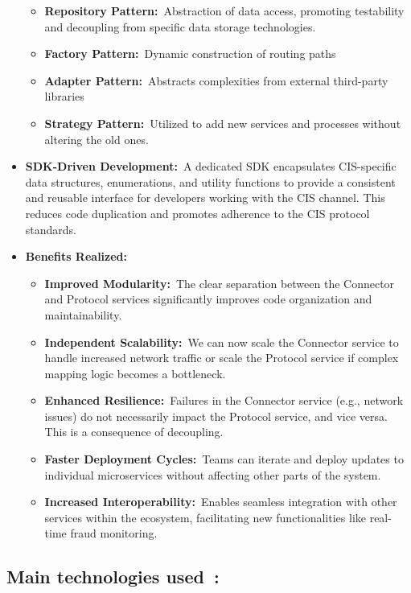 \documentclass[12pt,a4paper]{report}
\begin{document}
\begin{itemize}
  \begin{itemize}
  \item
    \textbf{Repository Pattern:}~Abstraction of data access, promoting
    testability and decoupling from specific data storage technologies.
  \item
    \textbf{Factory Pattern:}~Dynamic construction of routing paths
  \item
    \textbf{Adapter Pattern:}~Abstracts complexities from external
    third-party libraries
  \item
    \textbf{Strategy Pattern:}~Utilized to add new services and
    processes without altering the old ones.
  \end{itemize}
\item
  \textbf{SDK-Driven Development:}~A dedicated SDK encapsulates
  CIS-specific data structures, enumerations, and utility functions to
  provide a consistent and reusable interface for developers working
  with the CIS channel. This reduces code duplication and promotes
  adherence to the CIS protocol standards.
\item
  \textbf{Benefits Realized:}

  \begin{itemize}
  \item
    \textbf{Improved Modularity:}~The clear separation between the
    Connector and Protocol services significantly improves code
    organization and maintainability.
  \item
    \textbf{Independent Scalability:}~We can now scale the Connector
    service to handle increased network traffic or scale the Protocol
    service if complex mapping logic becomes a bottleneck.
  \item
    \textbf{Enhanced Resilience:}~Failures in the Connector service
    (e.g., network issues) do not necessarily impact the Protocol
    service, and vice versa. This is a consequence of decoupling.
  \item
    \textbf{Faster Deployment Cycles:}~Teams can iterate and deploy
    updates to individual microservices without affecting other parts of
    the system.
  \item
    \textbf{Increased Interoperability:}~Enables seamless integration
    with other services within the ecosystem, facilitating new
    functionalities like real-time fraud monitoring.
  \end{itemize}
\end{itemize}

\hypertarget{main-technologies-used}{%
\subsection{\texorpdfstring{\textbf{Main technologies
used~:}}{Main technologies used~:}}\label{main-technologies-used}}
\end{document}
